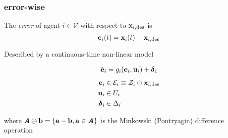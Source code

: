 \begin{frame} %
  \frametitle{error-wise}

  The \textit{error} of agent $i\in\mathcal{V}$ with respect to $\bm{\mathbf{x}}_{i,\text{des}}$
  is
  $$\bm{\mathbf{e}}_i(t) = \bm{\mathbf{x}}_i(t) - \bm{\mathbf{x}}_{i,\text{des}}$$

  Described by a continuous-time non-linear model

  \begin{align}
    \dot{\bm{\mathbf{e}}}_i = g_i(\bm{\mathbf{e}}_i, \bm{\mathbf{u}}_i) + \bm{\mathbf{\delta}}_i
  \end{align}
  \begin{align}
    \bm{\mathbf{e}}_i &\in \mathcal{E}_i \equiv \mathcal{Z}_i \ominus \bm{\mathbf{x}}_{i,\text{des}} \\
    \bm{\mathbf{u}}_i &\in U_i \\
    \bm{\mathbf{\delta}}_i &\in \Delta_i
  \end{align}

  where $\bm{\mathit{A}} \ominus \bm{\mathbf{b}} = \{\bm{\mathbf{a}} - \bm{\mathbf{b}}, \bm{\mathbf{a}} \in \bm{\mathit{A}}\}$
  is the Minkowski (Pontryagin) difference operation

\end{frame} %
